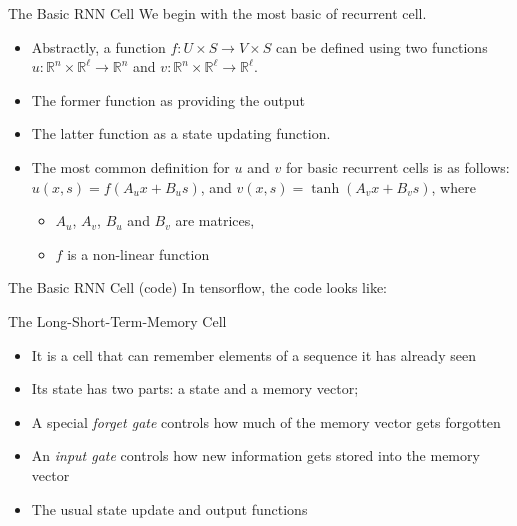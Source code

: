 \documentclass[10pt]{beamer}
\newcommand{\R}{\mathbb{R}}
\begin{document}
\begin{frame}{The Basic RNN Cell}
  We begin with the most basic of recurrent cell.
  \begin{itemize}
    \item Abstractly, a function $f:U\times S\to V\times S$ can be defined using two functions $u:\R^n\times \R^\ell\to \R^n$ and $v:\R^n\times\R^\ell \to \R^\ell$.
    \item The former function as providing the output
    \item The latter function as a state updating function.
    \item The most common definition for $u$ and $v$ for basic recurrent cells is as follows: $u(x, s) = f(A_ux+B_us)$, and $v(x, s) = \tanh(A_vx+B_vs)$, where
    \begin{itemize}
      \item $A_u$, $A_v$, $B_u$ and $B_v$ are matrices,
      \item $f$ is a non-linear function
    \end{itemize}
  \end{itemize}
\end{frame}

\begin{frame}{The Basic RNN Cell (code)}
  In tensorflow, the code looks like:

\lstI
\end{frame}


\begin{frame}{The Long-Short-Term-Memory Cell}

\begin{itemize}
  \item It is a cell that can remember elements of a sequence it has already seen
  \item Its state has two parts: a state and a memory vector;
  \item A special {\em forget gate} controls how much of the memory vector gets forgotten
  \item An {\em input gate} controls how new information gets stored into the memory vector
  \item The usual state update and output functions
\end{itemize}
\end{frame}
\end{document}
